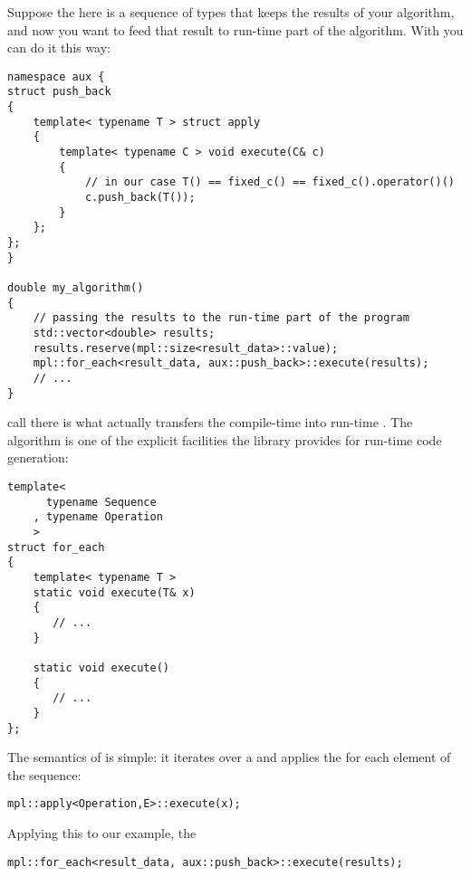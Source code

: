 \documentclass{kapproc}
\begin{document}
Suppose the  here is a sequence of 
 types that keeps the results of your 
algorithm, and now you want to feed that result to run-time part 
of the algorithm. With  you can do it this way:

{\small
\begin{codesamp}\begin{verbatim}
namespace aux {
struct push_back
{
    template< typename T > struct apply
    {
        template< typename C > void execute(C& c)
        {
            // in our case T() == fixed_c() == fixed_c().operator()()
            c.push_back(T());
        }
    };
};
}

double my_algorithm()
{
    // passing the results to the run-time part of the program
    std::vector<double> results;
    results.reserve(mpl::size<result_data>::value);
    mpl::for_each<result_data, aux::push_back>::execute(results);
    // ...
}
\end{verbatim}
\end{codesamp}
}

 call there is what actually 
transfers the compile-time  into run-time 
. The  algorithm 
is one of the explicit facilities the library provides for run-time 
code generation:

{\small
\begin{codesamp}\begin{verbatim}
template<
      typename Sequence
    , typename Operation
    >
struct for_each
{
    template< typename T >
    static void execute(T& x)
    {
       // ...
    }

    static void execute()
    {
       // ...
    }
};
\end{verbatim}
\end{codesamp}
}

The semantics of  is simple: it 
iterates over a  and applies the 
for each element  of the sequence:

{\small
\begin{codesamp}\begin{verbatim}
mpl::apply<Operation,E>::execute(x);
\end{verbatim}
\end{codesamp}
}

Applying this to our example, the 

{\small
\begin{codesamp}\begin{verbatim}
mpl::for_each<result_data, aux::push_back>::execute(results);
\end{verbatim}
\end{codesamp}
}
\end{document}

